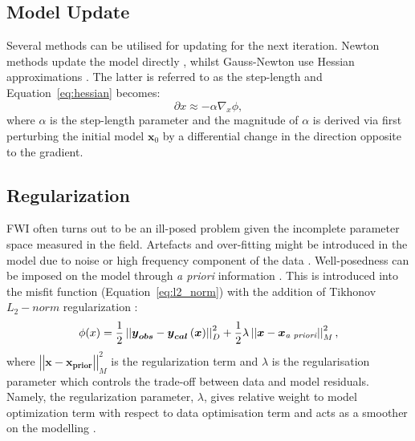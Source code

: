 \subsection{Model Update}\label{sec:theory_model_update}
Several methods can be utilised for updating for the next iteration. Newton methods update the model directly \citep{Newton1687}, whilst Gauss-Newton use Hessian approximations \citep{Tarantola1984}. The latter is referred to as the step-length \citep{Menke1989} and Equation~\ref{eq:hessian} becomes:
\begin{equation}
	\partial x \approx -\alpha\nabla_x\phi,
\end{equation}
where $\alpha$ is the step-length parameter and the magnitude of $\alpha$ is derived via first perturbing the initial model $\boldsymbol{x}_0$ by a differential change in the direction opposite to the gradient.
\subsection{Regularization}\label{sec:theory_regularization_fwi}
FWI often turns out to be an ill-posed problem given the incomplete parameter space measured in the field. Artefacts and over-fitting might be introduced in the model due to noise or high frequency component of the data \citep{Sirgue2004}. 
Well-posedness can be imposed on the model through \emph{a priori} information \citep{Asnaashari2013}. This is introduced into the misfit function (Equation~\ref{eq:l2_norm}) with the addition of Tikhonov $L_2-norm$ regularization \citep{Tikhonov1977}:
\begin{equation}
	\phi(x)=\frac{1}{2} \left|\left|\boldsymbol{y}_{\boldsymbol{obs}}-\boldsymbol{y}_{\boldsymbol{cal}}\left(\boldsymbol{x}\right)\right|\right|_D^2  + \frac{1}{2}\lambda\left|\left|\boldsymbol{x}-\boldsymbol{x}_{\boldsymbol{\emph{a priori}}}\right|\right|_M^2,
\end{equation}
where $\left|\left|\boldsymbol{x}-\boldsymbol{x}_{\boldsymbol{prior}}\right|\right|_M^2$ is the regularization term and $\lambda$ is the regularisation parameter which controls the trade-off between data and model residuals. Namely, the regularization parameter, $\lambda$, gives relative weight to model optimization term with respect to data optimisation term and acts as a smoother on the modelling \citep{Tikhonov1963}. 


